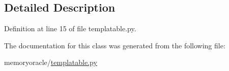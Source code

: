 \subsection{Detailed Description}


Definition at line 15 of file templatable.\+py.



The documentation for this class was generated from the following file\+:\begin{DoxyCompactItemize}
\item 
memoryoracle/\hyperlink{templatable_8py}{templatable.\+py}\end{DoxyCompactItemize}
